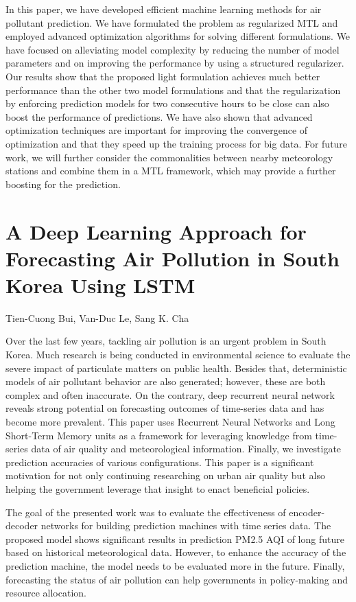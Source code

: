 In this paper, we have developed efficient machine learning methods for air pollutant prediction.
We have formulated the problem as regularized MTL and employed advanced optimization algorithms
for solving different formulations. We have focused on alleviating model complexity by reducing the
number of model parameters and on improving the performance by using a structured regularizer.
Our results show that the proposed light formulation achieves much better performance than the
other two model formulations and that the regularization by enforcing prediction models for two
consecutive hours to be close can also boost the performance of predictions. We have also shown that
advanced optimization techniques are important for improving the convergence of optimization and
that they speed up the training process for big data. For future work, we will further consider the
commonalities between nearby meteorology stations and combine them in a MTL framework, which
may provide a further boosting for the prediction.

\section{A Deep Learning Approach for Forecasting Air Pollution in South Korea Using LSTM}

Tien-Cuong Bui, Van-Duc Le, Sang K. Cha

Over the last few years, tackling air pollution is an urgent problem in
South Korea. Much research is being conducted in environmental science to
evaluate the severe impact of particulate matters on public health. Besides that,
deterministic models of air pollutant behavior are also generated; however, these
are both complex and often inaccurate. On the contrary, deep recurrent neural
network reveals strong potential on forecasting outcomes of time-series data and
has become more prevalent. This paper uses Recurrent Neural Networks and
Long Short-Term Memory units as a framework for leveraging knowledge from
time-series data of air quality and meteorological information. Finally, we
investigate prediction accuracies of various configurations. This paper is a
significant motivation for not only continuing researching on urban air quality
but also helping the government leverage that insight to enact beneficial policies.

The goal of the presented work was to evaluate the effectiveness of encoder-decoder
networks for building prediction machines with time series data. The proposed model
shows significant results in prediction PM2.5 AQI of long future based on historical
meteorological data. However, to enhance the accuracy of the prediction machine, the
model needs to be evaluated more in the future. Finally, forecasting the status of air
pollution can help governments in policy-making and resource allocation.

